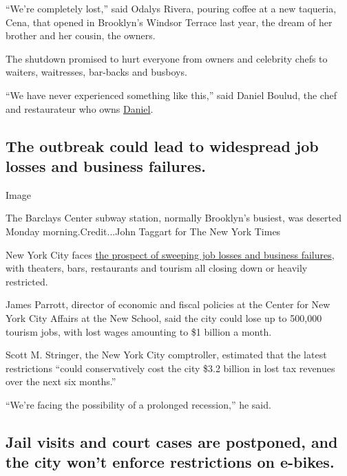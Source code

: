 ``We're completely lost,'' said Odalys Rivera, pouring coffee at a new
taqueria, Cena, that opened in Brooklyn's Windsor Terrace last year, the
dream of her brother and her cousin, the owners.

The shutdown promised to hurt everyone from owners and celebrity chefs
to waiters, waitresses, bar-backs and busboys.

``We have never experienced something like this,'' said Daniel Boulud,
the chef and restaurateur who owns
\href{https://www.nytimes.com/2013/07/24/dining/reviews/restaurant-review-daniel-on-the-upper-east-side.html}{Daniel}.

\hypertarget{the-outbreak-could-lead-to-widespread-job-losses-and-business-failures}{%
\subsection{The outbreak could lead to widespread job losses and
business
failures.}\label{the-outbreak-could-lead-to-widespread-job-losses-and-business-failures}}

Image

The Barclays Center subway station, normally Brooklyn's busiest, was
deserted Monday morning.Credit...John Taggart for The New York Times

New York City faces
\href{https://www.nytimes.com/2020/03/16/nyregion/Coronavirus-nyc-economy-.html}{the
prospect of sweeping job losses and business failures}, with theaters,
bars, restaurants and tourism all closing down or heavily restricted.

James Parrott, director of economic and fiscal policies at the Center
for New York City Affairs at the New School, said the city could lose up
to 500,000 tourism jobs, with lost wages amounting to \$1 billion a
month.

Scott M. Stringer, the New York City comptroller, estimated that the
latest restrictions ``could conservatively cost the city \$3.2 billion
in lost tax revenues over the next six months.''

``We're facing the possibility of a prolonged recession,'' he said.

\hypertarget{jail-visits-and-court-cases-are-postponed-and-the-city-wont-enforce-restrictions-on-e-bikes}{%
\subsection{Jail visits and court cases are postponed, and the city
won't enforce restrictions on
e-bikes.}\label{jail-visits-and-court-cases-are-postponed-and-the-city-wont-enforce-restrictions-on-e-bikes}}

